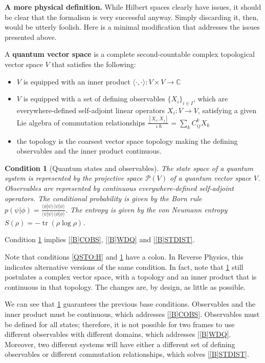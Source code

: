 \documentclass[entropy,article,submit,moreauthors]{Definitions/mdpi}
\newtheorem{condth}{Condition}
\renewcommand*{\thecondth}{\Roman{condth}}
\newenvironment{condition}[2][]{\renewcommand{\thecondth}{#2}\begin{condth}[#1]\label{#2}}{\end{condth}\renewcommand{\thecondth}{\Roman{condth}}}
\def\>{\rangle}
\def\<{\langle}
\DeclareMathOperator{\tr}{tr}
\begin{document}
\textbf{A more physical definition.} While Hilbert spaces clearly have issues, it should be clear that the formalism is very successful anyway. Simply discarding it, then, would be utterly foolish. Here is a minimal modification that addresses the issues presented above.
\begin{Definition}
	A \textbf{quantum vector space} is a complete second-countable complex topological vector space $V$ that satisfies the following:
	\begin{itemize}
		\item $V$ is equipped with an inner product $\< \cdot , \cdot \> : V \times V \to \mathbb{C}$
		\item $V$ is equipped with a set of defining observables $\{X_i\}_{i \in I}$, which are everywhere-defined self-adjoint linear operators $X_i : V \to V$, satisfying a given Lie algebra of commutation relationships $\frac{[X_i, X_j]}{\imath \hbar} = \sum\limits_k C_{ij}^k X_k$
		\item the topology is the coarsest vector space topology making the defining observables and the inner product continuous.
	\end{itemize}
\end{Definition}
\begin{condition}[Quantum states and observables]{QSTO:V}
	The state space of a quantum system is represented by the projective space $\mathcal{P}(V)$ of a quantum vector space $V$. Observables are represented by continuous everywhere-defined self-adjoint operators. The conditional probability is given by the Born rule $p(\psi|\phi) = \frac{\< \phi | \psi \>\< \psi | \phi \>}{\< \psi | \psi \>\< \phi | \phi \>}$.  The entropy is given by the von Neumann entropy $S(\rho) = -\tr(\rho \log \rho)$.
\end{condition}
\begin{Theorem}
	Condition \ref{QSTO:V} implies \ref{[B]COBS}, \ref{[B]WDQ} and \ref{[B]STDIST}.
\end{Theorem}

Note that conditions \ref{QSTO:H} and \ref{QSTO:V} have a colon. In Reverse Physics, this indicates alternative versions of the same condition. In fact, note that \ref{QSTO:V} still postulates a complex vector space, with a topology and an inner product that is continuous in that topology. The changes are, by design, as little as possible.

We can see that \ref{QSTO:V} guarantees the previous base conditions. Observables and the inner product must be continuous, which addresses \ref{[B]COBS}. Observables must be defined for all states; therefore, it is not possible for two frames to use different observables with different domains, which addresses \ref{[B]WDQ}. Moreover, two different systems will have either a different set of defining observables or different commutation relationships, which solves \ref{[B]STDIST}.
\end{document}
